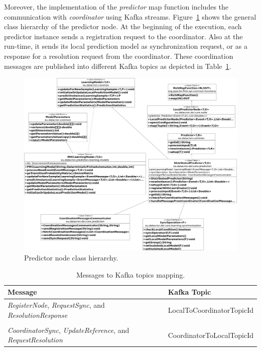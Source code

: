 \par Moreover, the implementation of the \textit{predictor} map function includes the communication  with \textit{coordinator} using Kafka streams.
Figure~\ref{fig:class_diagram} shows the general class hierarchy of the predictor node. At the beginning of the execution,  each predictor instance sends a registration request to the coordinator. Also at the run-time,  it sends  its local prediction model as synchronization request,  or as a response for a resolution request from the coordinator. These coordination messages are published into different Kafka topics as depicted in Table~\ref{tab:messagesToTopics}. 
 
 
 \begin{figure}[H]
 	\centering
 	\includegraphics[width=\textwidth,height=\linewidth]{chapters/figures/predictor_diagram.png}
 	
 	\caption{Predictor node class hierarchy.}
 	\label{fig:class_diagram}
 \end{figure}

 
\begin{center}
\centering
\begin{table}[h]
	\caption{Messages to Kafka topics mapping.}
	\label{tab:messagesToTopics}
	\begin{tabular}{p{8cm}l}
		\toprule
		Message &Kafka Topic\\
		\midrule
		\parbox[t]{8cm}{\textit{RegisterNode}, \textit{RequestSync},  and \textit{ResolutionResponse} } & LocalToCoordinatorTopicId\\ \\
		
			  \parbox[t]{8cm}{\textit{CoordinatorSync}, \textit{UpdateReference}, and \\ \textit{RequestResolution}} & CoordinatorToLocalTopicId\\
		\bottomrule
	\end{tabular}
\end{table}

\end{center}

